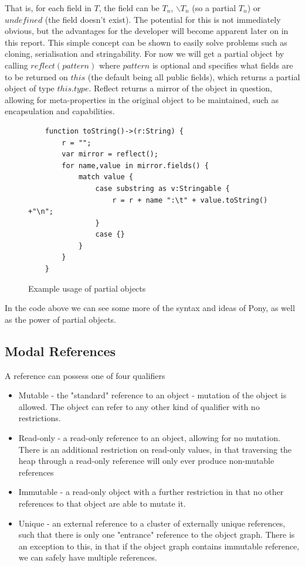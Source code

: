 \documentclass[pdftex,12pt,a4paper]{article}
\begin{document}
That is, for each field in $T$, the field can be $T_{n}$, $\backslash T_{n}$ (so a partial $T_{n}$) or $undefined$ (the field doesn't exist).
The potential for this is not immediately obvious, but the advantages for the developer will become apparent later on in this report.
This simple concept can be shown to easily solve problems such as cloning, serialisation and stringability.
For now we will get a partial object by calling $reflect(pattern)$ where $pattern$ is optional and specifies what fields are to be returned on $this$ (the default being all public fields), which returns a partial object of type $this.type$.
Reflect returns a mirror\cite{mirror-paper} of the object in question, allowing for meta-properties in the original object to be maintained, such as encapsulation and capabilities.

\begin{figure}[H]
\begin{verbatim}
    function toString()->(r:String) {
        r = "";
        var mirror = reflect();
        for name,value in mirror.fields() {
            match value {
                case substring as v:Stringable {
                    r = r + name ":\t" + value.toString() +"\n";
                }
                case {}
            }
        }
    }
\end{verbatim}
\caption{Example usage of partial objects}
\label{fig:partialobj}
\end{figure}

In the code above we can see some more of the syntax and ideas of Pony, as well as the power of partial objects.

\subsection{Modal References}
\label{sec:immutability}

A reference can possess one of four qualifiers\cite{microsoft2012}

\begin{itemize}
	\item Mutable - the "standard" reference to an object - mutation of the object is allowed. 
		The object can refer to any other kind of qualifier with no restrictions.
	\item Read-only - a read-only reference to an object, allowing for no mutation.
		There is an additional restriction on read-only values, in that traversing the heap through a read-only reference will only ever produce non-mutable references
	\item Immutable - a read-only object with a further restriction in that no other references to that object are able to mutate it.
	\item Unique - an external reference to a cluster of externally unique references, such that there is only one "entrance" reference to the object graph.
		There is an exception to this, in that if the object graph contains immutable reference, we can safely have multiple references.
\end{itemize}
\end{document}
